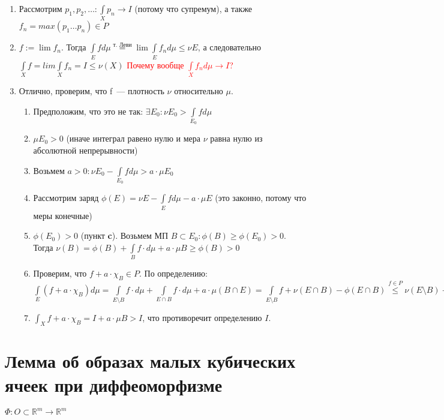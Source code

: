 \documentclass[paper=a4, fontsize=14pt]{report}
\begin{document}
\begin{itemize}
\begin{enumerate}
				$\exists$ последовательсность $f_1 \leq f_2 \leq \dots \in P : \int\limits_X f_n d\mu \rightarrow I$ докажем, что она существует
				\item
				Рассмотрим $p_1, p_2, \dots : \int\limits_X p_n \rightarrow I$ (потому что супремум), а также $f_n = max(p_1 \dots p_n) \in P$
				\item
				$f := \lim f_n$. Тогда $\int\limits_E f d\mu \overset{\text{т. Леви}}{=} \lim \int\limits_E f_n d\mu \leq \nu E$, а следовательно $\int\limits_X f = lim \int\limits_X f_n = I \leq \nu(X)$
				\textcolor{red}{Почему вообще $\int\limits_X f_n d\mu \rightarrow I$?}
				\item
				Отлично, проверим, что f~--- плотность $\nu$ относительно $\mu$.
				\begin{enumerate}
					\item
					Предположим, что это не так: $\exists E_0 : \nu E_0 > \int\limits_{E_0} f d\mu$
					\item
					$\mu E_0 > 0$ (иначе интеграл равено нулю и мера $\nu$ равна нулю из абсолютной непрерывности)
					\item
					Возьмем $a > 0 : \nu E_0 - \int\limits_{E_0} f d\mu > a \cdot \mu E_0$
					\item
					Рассмотрим заряд $\phi(E) = \nu E - \int\limits_E f d\mu - a \cdot \mu E$ (это законно, потому что меры конечные)
					\item
					$\phi(E_0) > 0$ (пункт \textbf{c}). Возьмем МП $B \subset E_0 : \phi(B) \geq \phi(E_0) > 0$. Тогда $\nu(B) = \phi(B) + \int\limits_B f \cdot d\mu + a \cdot \mu B \geq \phi(B) > 0$
					\item
					Проверим, что $f + a \cdot \chi_B \in P$.
                    По определению: $\int\limits_E(f + a \cdot \chi_B)d\mu = \int\limits_{E \setminus B} f \cdot d\mu + \int\limits_{E \cap B} f \cdot d\mu + a \cdot \mu(B \cap E) = \int\limits_{E \setminus B} f + \nu(E \cap B) - \phi (E \cap B) \overset{f \in P}{\leq} \nu(E \setminus B) + \nu(E \cap B) - \phi(E \cap B) = \nu E - \phi(E \cap B) \overset{\phi \geq 0}{\leq} \nu E$
					\item
					$\int_X f + a \cdot \chi_B = I  + a \cdot \mu B > I$, что противоречит определению $I$.
				\end{enumerate}
			\end{enumerate}
\end{itemize}

\section{Лемма об образах малых кубических ячеек при диффеоморфизме}
$\Phi: O \subset \mathds{R}^m \rightarrow \mathds{R}^m$
\end{document}
